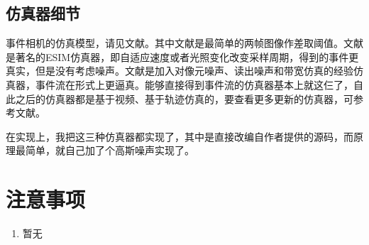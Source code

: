 \documentclass{article}
\begin{document}
\subsection{仿真器细节}
事件相机的仿真模型，请见文献\cite{kaiser_towards_2016,rebecq_esim_2018,joubert_event_2021}。其中文献\cite{kaiser_towards_2016}是最简单的两帧图像作差取阈值。文献\cite{rebecq_esim_2018}是著名的ESIM仿真器，即自适应速度或者光照变化改变采样周期，得到的事件更真实，但是没有考虑噪声。文献\cite{joubert_event_2021}是加入对像元噪声、读出噪声和带宽仿真的经验仿真器，事件流在形式上更逼真。能够直接得到事件流的仿真器基本上就这仨了，自此之后的仿真器都是基于视频、基于轨迹仿真的，要查看更多更新的仿真器，可参考文献\cite{chakravarthi_recent_2024}。\par
在实现上，我把这三种仿真器都实现了，其中\cite{rebecq_esim_2018,joubert_event_2021}是直接改编自作者提供的源码，而\cite{kaiser_towards_2016}原理最简单，就自己加了个高斯噪声实现了。
\section{注意事项}
\begin{enumerate}
  \item 暂无
\end{enumerate}
\newpage
\printbibliography[heading=bibliography,title=参考文献]
\end{document}
